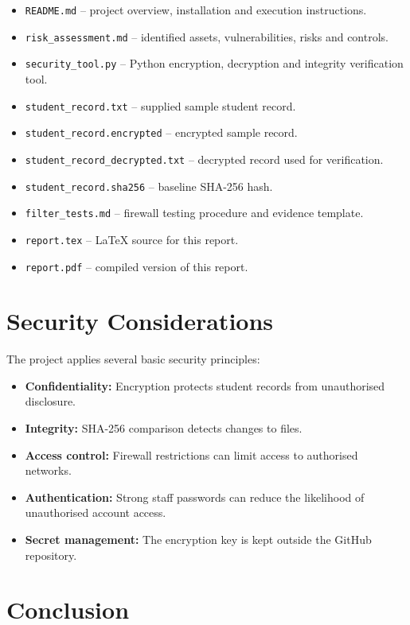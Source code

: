 \documentclass[12pt,a4paper]{article}
\begin{document}
\begin{itemize}
    \item \texttt{README.md} -- project overview, installation and execution instructions.
    \item \texttt{risk\_assessment.md} -- identified assets, vulnerabilities, risks and controls.
    \item \texttt{security\_tool.py} -- Python encryption, decryption and integrity verification tool.
    \item \texttt{student\_record.txt} -- supplied sample student record.
    \item \texttt{student\_record.encrypted} -- encrypted sample record.
    \item \texttt{student\_record\_decrypted.txt} -- decrypted record used for verification.
    \item \texttt{student\_record.sha256} -- baseline SHA-256 hash.
    \item \texttt{filter\_tests.md} -- firewall testing procedure and evidence template.
    \item \texttt{report.tex} -- LaTeX source for this report.
    \item \texttt{report.pdf} -- compiled version of this report.
\end{itemize}

\section{Security Considerations}

The project applies several basic security principles:

\begin{itemize}
    \item \textbf{Confidentiality:} Encryption protects student records from unauthorised disclosure.
    \item \textbf{Integrity:} SHA-256 comparison detects changes to files.
    \item \textbf{Access control:} Firewall restrictions can limit access to authorised networks.
    \item \textbf{Authentication:} Strong staff passwords can reduce the likelihood of unauthorised account access.
    \item \textbf{Secret management:} The encryption key is kept outside the GitHub repository.
\end{itemize}

\section{Conclusion}
\end{document}
